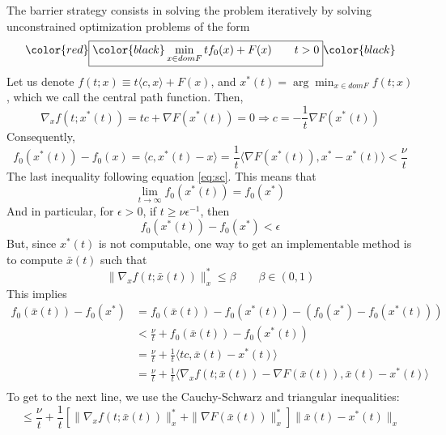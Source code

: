 \documentclass[12pt, openany]{report}
\theoremstyle{definition}
\begin{document}
The barrier strategy consists in solving the problem iteratively by solving unconstrained optimization problems of the form
\begin{equation}
	\color{red}\boxed{\color{black}\min_{x\in domF}tf_0(x) + F(x)\qquad t>0}\color{black}
\end{equation}
Let us denote $f(t;x)\equiv t\langle c,x\rangle +F(x)$, and $x^*(t) = \arg\min_{x\in domF}f(t;x)$, which we call the central path function. Then, 
\begin{equation}\label{eq:central_path}
	\nabla_x f(t;x^*(t)) = tc + \nabla F(x^*(t)) = 0 \Longrightarrow c = -\frac{1}{t}\nabla F(x^*(t))
\end{equation}
Consequently, 
\begin{equation}
	f_0(x^*(t)) - f_0(x) = \langle c,x^*(t)-x\rangle = \frac{1}{t} \langle \nabla F(x^*(t)),x^*-x^*(t)\rangle  < \frac{\nu}{t}
\end{equation}
The last inequality following equation \eqref{eq:sc}. This means that 
\begin{equation}
	\lim_{t\to \infty} f_0(x^*(t)) = f_0(x^*)
\end{equation}
And in particular, for $\epsilon>0$, if $t\ge \nu \epsilon^{-1}$, then
\begin{equation}
	f_0(x^*(t)) - f_0(x^*) < \epsilon
\end{equation}
But, since $x^*(t)$ is not computable, one way to get an implementable method is to compute $\bar x(t)$ such that 
\begin{equation}\label{eq:beta}
	\|\nabla_x f(t;\bar x(t))\|_x^* \le \beta\qquad \beta \in (0,1)
\end{equation}
This implies 
\begin{equation}
	\begin{aligned}
		f_0(\bar x(t)) - f_0(x^*) &= f_0(\bar x(t)) - f_0(x^*(t)) -(f_0(x^*) - f_0(x^*(t)))\\
		& < \frac{\nu}{t} + f_0(\bar x(t)) - f_0(x^*(t))\\
		& = \frac{\nu}{t} + \frac{1}{t} \langle tc, \bar x(t)-x^*(t)\rangle\\
		& = \frac{\nu}{t} + \frac{1}{t} \langle \nabla_x f(t;\bar x(t))-\nabla F(\bar x(t)), \bar x(t)-x^*(t)\rangle\\
	\end{aligned}
\end{equation}
To get to the next line, we use the Cauchy-Schwarz and triangular inequalities:
\begin{equation}
	\le \frac{\nu}{t} + \frac{1}{t} \left[ \|\nabla_x f(t;\bar x(t))\|_x^* + \|\nabla F(\bar x(t))\|_x^* \right] \|\bar x(t)-x^*(t)\|_x
\end{equation}
\end{document}
